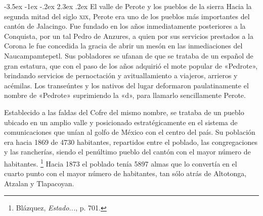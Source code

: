 \documentclass[14pt,twoside,final]{extbook} %
\makeatletter
\let\oldfootnote\footnote
\renewcommand\footnote[1]{%
\oldfootnote{\hspace{1mm}#1}}
\renewcommand\section{\@startsection {section}{1}{\z@}%
                                     {-3.5ex \@plus -1ex \@minus -.2ex}%
                                     {2.3ex \@plus .2ex}%
                                     {\normalfont\large\bfseries\sc}}
\makeatother
\begin{document}
\section{El valle de Perote y los pueblos de la sierra}
\label{sec:valle-de-perote-y-pueblos-sierra}
Hacia la segunda mitad del siglo \textsc{xix}, Perote era uno de los pueblos más importantes del cantón de Jalacingo. Fue fundado en los años inmediatamente posteriores a la Conquista, por un tal Pedro de Anzures, a quien por sus servicios prestados a la Corona le fue concedida la gracia de abrir un mesón en las inmediaciones del Naucampamtepetl. Sus pobladores se ufanan de que se trataba de un español de gran estatura, que con el paso de los años adquirió el mote popular de «Pedrote», brindando servicios de pernoctación y avituallamiento a viajeros, arrieros y acémilas. Los transeúntes y los nativos del lugar deformaron paulatinamente el nombre de «Pedrote» suprimiendo la «d», para llamarlo sencillamente Perote.

Establecido a las faldas del Cofre del mismo nombre, se trataba de un pueblo ubicado en un amplio valle y posicionado estratégicamente en el sistema de comunicaciones que unían al golfo de México con el centro del país. Su población era hacia 1869 de 4730 habitantes, repartidos entre el poblado, las congregaciones y las rancherías, siendo el penúltimo pueblo del cantón con el mayor número de habitantes.\footnote{Blázquez, \emph{Estado...}, p. 701.} Hacia 1873 el poblado tenía 5897 almas que lo convertía en el cuarto punto con el mayor número de habitantes, tan sólo atrás de Altotonga, Atzalan y Tlapacoyan.
\end{document}

